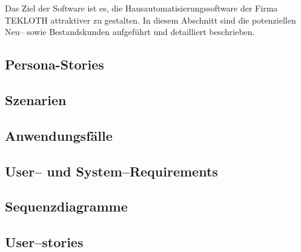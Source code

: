 Das Ziel der Software ist es, die Hausautomatisierungssoftware der Firma TEKLOTH attraktiver zu gestalten.
In diesem Abschnitt sind die potenziellen Neu-- sowie Bestandskunden aufgeführt und detailliert beschrieben.

\subsection{Persona-Stories}\label{subsec:persona-stories}
    


\subsection{Szenarien}\label{subsec:szenarien}
    


\subsection{Anwendungsfälle}\label{subsec:anwendungsfaelle}
    


\subsection{User-- und System--Requirements}\label{subsec:user-and-system-requirements}
    


\subsection{Sequenzdiagramme}\label{subsec:sequenzdiagramme}
    


\subsection{User--stories}\label{subsec:user-stories}
    